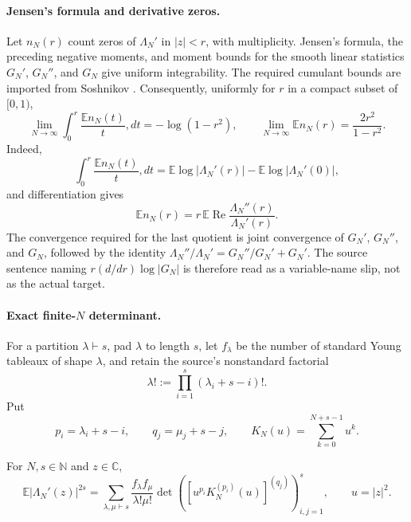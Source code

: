 \paragraph{Jensen's formula and derivative zeros.}
Let $n_N(r)$ count zeros of $\Lambda_N'$ in $|z|<r$, with multiplicity.  Jensen's formula,
the preceding negative moments, and moment bounds for the smooth linear statistics
$G_N'$, $G_N''$, and $G_N$ give uniform integrability.  The required cumulant bounds are
imported from Soshnikov \cite{soshnikov2000}.  Consequently, uniformly for $r$ in a compact
subset of $[0,1)$,
\begin{equation}
 \lim_{N\to\infty}\int_0^r\frac{\mathbb E n_N(t)}t,dt=-\log(1-r^2),
 \qquad
 \lim_{N\to\infty}\mathbb E n_N(r)=\frac{2r^2}{1-r^2}.
 \label{eq:SW-Jensen-result}
\end{equation}
Indeed,
\begin{equation}
 \int_0^r\frac{\mathbb E n_N(t)}t,dt
 =\mathbb E\log|\Lambda_N'(r)|-\mathbb E\log|\Lambda_N'(0)|,
\end{equation}
and differentiation gives
\begin{equation}
 \mathbb E n_N(r)=r\,\mathbb E\operatorname{Re}
 \frac{\Lambda_N''(r)}{\Lambda_N'(r)}.
\end{equation}
The convergence required for the last quotient is joint convergence of $G_N'$, $G_N''$,
and $G_N$, followed by the identity
$\Lambda_N''/\Lambda_N'=G_N''/G_N'+G_N'$.  The source sentence naming
$r(d/dr)\log|G_N|$ is therefore read as a variable-name slip, not as the actual target.

\paragraph{Exact finite-$N$ determinant.}
For a partition $\lambda\vdash s$, pad $\lambda$ to length $s$, let $f_\lambda$ be the
number of standard Young tableaux of shape $\lambda$, and retain the source's nonstandard
factorial
\begin{equation}
 \lambda!:=\prod_{i=1}^{s}(\lambda_i+s-i)!.
 \label{eq:SW-partition-factorial}
\end{equation}
Put
\begin{equation}
 p_i=\lambda_i+s-i,\qquad q_j=\mu_j+s-j,
 \qquad K_N(u)=\sum_{k=0}^{N+s-1}u^k.
 \label{eq:SW-pq-kernel}
\end{equation}

\begin{theorem}
\label{thm:SW-finite-determinant}
For $N,s\in\mathbb N$ and $z\in\mathbb C$,
\begin{equation}
 \mathbb E|\Lambda_N'(z)|^{2s}
 =\sum_{\lambda,\mu\vdash s}\frac{f_\lambda f_\mu}{\lambda!\mu!}
 \det\!\left(\left[u^{p_i}K_N^{(p_i)}(u)\right]^{(q_j)}\right)_{i,j=1}^{s},
 \qquad u=|z|^2.
 \label{eq:SW-finite-determinant}
\end{equation}
\end{theorem}

